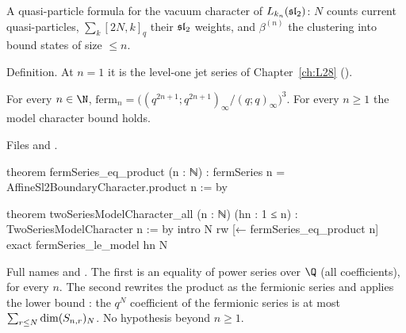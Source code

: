 \begin{physics}
A quasi-particle formula for the vacuum character of $L_{k_n}(\mathfrak{sl}_2)$: $N$ counts current quasi-particles,
$\sum_k[2N,k]_q$ their $\mathfrak{sl}_2$ weights, and $\beta^{(n)}$ the clustering into bound states of size $\le n$.
\end{physics}

\begin{status}
Definition. At $n=1$ it is the level-one jet series of Chapter~\ref{ch:L28} ().
\end{status}

\begin{theorem}\label{l29:thm:modelchar}
For every $n\in\N$, $\mathrm{ferm}_n=\bigl((q^{2n+1};q^{2n+1})_\infty/(q;q)_\infty\bigr)^3$. For every $n\ge1$ the
model character bound holds.
\end{theorem}

\noindent Files  and
.
\begin{leancode}
theorem fermSeries_eq_product (n : ℕ) :
    fermSeries n = AffineSl2BoundaryCharacter.product n := by

theorem twoSeriesModelCharacter_all (n : ℕ) (hn : 1 ≤ n) : TwoSeriesModelCharacter n := by
  intro N
  rw [← fermSeries_eq_product n]
  exact fermSeries_le_model hn N
\end{leancode}

\begin{dictionary}
Full names  and .
The first is an equality of power series over $\Q$ (all coefficients), for every $n$. The second rewrites the product
as the fermionic series and applies the lower bound : the $q^N$ coefficient of the fermionic
series is at most $\sum_{r\le N}\dim(S_{n,r})_N$. No hypothesis beyond $n\ge1$.
\end{dictionary}

